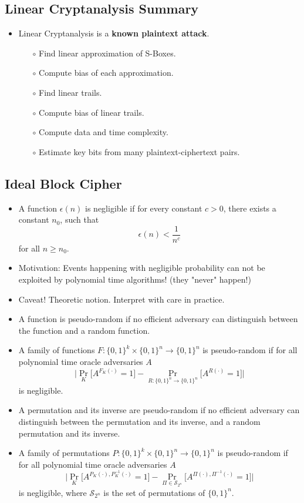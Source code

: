 \documentclass[a4paper]{scrartcl}
\begin{document}
\subsection*{Linear Cryptanalysis Summary}
\begin{itemize}
\item Linear Cryptanalysis is a \textbf{known plaintext attack}.
\begin{itemize}
\item [$\circ$] Find linear approximation of S-Boxes.
\item [$\circ$] Compute bias of each approximation.
\item [$\circ$] Find linear trails.
\item [$\circ$] Compute bias of linear trails.
\item [$\circ$] Compute data and time complexity.
\item [$\circ$] Estimate key bits from many plaintext-ciphertext pairs.
\end{itemize}
\end{itemize}

\subsection*{Ideal Block Cipher}

\begin{itemize}
\item A function $\epsilon(n)$ is negligible if for every constant $c > 0$, there exists a constant $n_0$, such that $$\epsilon(n) < \frac{1}{n^c}$$ for all $n \geq n_0$.
\item Motivation: Events happening with negligible probability can not be exploited by polynomial time algorithms! (they "never" happen!)
\item Caveat! Theoretic notion. Interpret with care in practice.
\item A function is pseudo-random if no efficient adversary can distinguish between the function and a random function.
\item A family of functions $F: \{0,1\}^k \times \{0,1\}^n \rightarrow \{0,1\}^n$ is pseudo-random if for all polynomial time oracle adversaries $A$
$$\Bigg|\Pr_{K} \Big[A^{F_K(\cdot)}=1 \Big] - \Pr_{R:\{0,1\}^n \rightarrow \{0,1\}^n} \Big[A^{R(\cdot)}=1\Big] \Bigg|$$ is negligible.
\item A permutation and its inverse are pseudo-random if no efficient adversary can distinguish between the permutation and its inverse, and a random permutation and its inverse.
\item A family of permutations $P: \{0,1\}^k \times \{0,1\}^n \rightarrow \{0,1\}^n$ is pseudo-random if for all polynomial time oracle adversaries $A$
$$\Bigg|\Pr_{K} \Big[A^{P_K(\cdot),P_K^{-1}(\cdot)}=1 \Big] - \Pr_{\Pi \in {\mathcal S}_{2^n}} \Big[A^{\Pi(\cdot),\Pi^{-1}(\cdot)}=1\Big] \Bigg|$$ 
is negligible, where ${\mathcal S}_{2^n}$ is the set of permutations of $\{0,1\}^n$.
\end{itemize}
\end{document}
